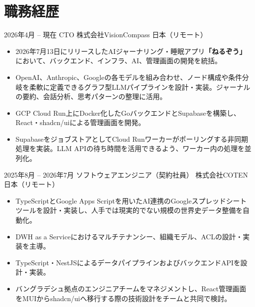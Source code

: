 \documentclass[10pt,a4paper]{moderncv}
\begin{document}
\newpage
\section{職務経歴}

\cventry
    {2026年4月 -- 現在}
    {CTO}
    {株式会社VisionCompass}
    {日本（リモート）}
    {}
    {
      \begin{itemize}
        \item 2026年7月13日にリリースしたAIジャーナリング・睡眠アプリ\textbf{「ねるぞう」}において、バックエンド、インフラ、AI、管理画面の開発を統括。
        \item OpenAI、Anthropic、Googleの各モデルを組み合わせ、ノード構成や条件分岐を柔軟に定義できるグラフ型LLMパイプラインを設計・実装。ジャーナルの要約、会話分析、思考パターンの整理に活用。
        \item GCP Cloud Run上にDocker化したGoバックエンドとSupabaseを構築し、React・shadcn/uiによる管理画面を開発。
        \item SupabaseをジョブストアとしてCloud Runワーカーがポーリングする非同期処理を実装。LLM APIの待ち時間を活用できるよう、ワーカー内の処理を並列化。
      \end{itemize}
    }

\cventry
    {2025年8月 -- 2026年7月}
    {ソフトウェアエンジニア（契約社員）}
    {株式会社COTEN}
    {日本（リモート）}
    {}
    {
      \begin{itemize}
        \item TypeScriptとGoogle Apps Scriptを用いたAI連携のGoogleスプレッドシートツールを設計・実装し、人手では現実的でない規模の世界史データ整備を自動化。
        \item DWH as a Serviceにおけるマルチテナンシー、組織モデル、ACLの設計・実装を主導。
        \item TypeScript・NestJSによるデータパイプラインおよびバックエンドAPIを設計・実装。
        \item バングラデシュ拠点のエンジニアチームをマネジメントし、React管理画面をMUIからshadcn/uiへ移行する際の技術設計をチームと共同で検討。
      \end{itemize}
    }
\end{document}
